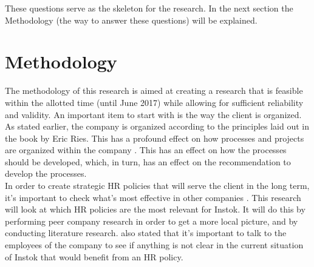 \documentclass[man]{apa6}
\begin{document}
These questions serve as the skeleton for the research. In the next section the Methodology (the way to answer these questions) will be explained.



\section{Methodology}
The methodology of this research is aimed at creating a research that is feasible within the allotted time (until June 2017) while allowing for sufficient reliability and validity. An important item to start with is the way the client is organized. As stated earlier, the company is organized according to the principles laid out in the book by Eric Ries. This has a profound effect on how processes and projects are organized within the company \parencite{RIES2011}. This has an effect on how the processes should be developed, which, in turn, has an effect on the recommendation to develop the processes.\\
In order to create strategic HR policies that will serve the client in the long term, it's important to check what's most effective in other companies \parencite{SNL2013}. This research will look at which HR policies are the most relevant for Instok. It will do this by performing peer company research in order to get a more local picture, and by conducting literature research. \cite{HRCA2016} also stated that it's important to talk to the employees of the company to see if anything is not clear in the current situation of Instok that would benefit from an HR policy.
\end{document}
